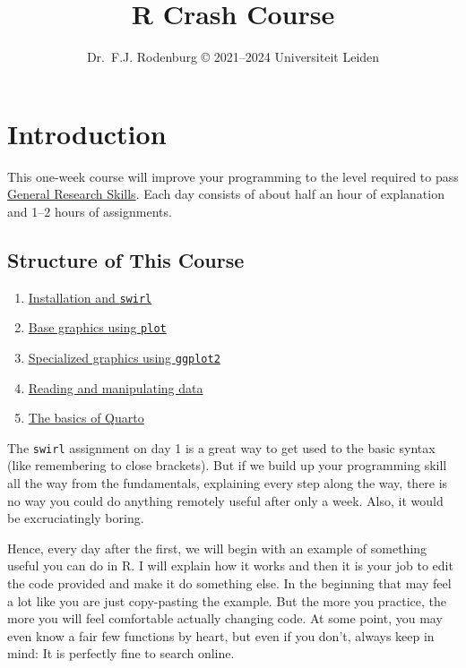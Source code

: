 \documentclass[
]{book}
\title{R Crash Course}
\author{Dr.~F.J. Rodenburg © 2021--2024 Universiteit Leiden}
\date{}
\providecommand{\tightlist}{%
  \setlength{\itemsep}{0pt}\setlength{\parskip}{0pt}}
\begin{document}
\maketitle

{
\setcounter{tocdepth}{1}
\tableofcontents
}
\hypertarget{introduction}{%
\chapter*{Introduction}\label{introduction}}

This one-week course will improve your programming to the level required to pass \href{https://ibl-inspire.github.io/General-Research-Skills/}{General Research Skills}. Each day consists of about half an hour of explanation and 1--2 hours of assignments.

\hypertarget{structure-of-this-course}{%
\section*{Structure of This Course}\label{structure-of-this-course}}

\begin{enumerate}
\def\labelenumi{\arabic{enumi}.}
\tightlist
\item
  \protect\hyperlink{installation}{Installation and \texttt{swirl}}
\item
  \protect\hyperlink{base-graphics}{Base graphics using \texttt{plot}}
\item
  \protect\hyperlink{ggplot2}{Specialized graphics using \texttt{ggplot2}}
\item
  \protect\hyperlink{data-manipulation}{Reading and manipulating data}
\item
  \protect\hyperlink{quarto}{The basics of Quarto}
\end{enumerate}

The \texttt{swirl} assignment on day 1 is a great way to get used to the basic syntax (like remembering to close brackets). But if we build up your programming skill all the way from the fundamentals, explaining every step along the way, there is no way you could do anything remotely useful after only a week. Also, it would be excruciatingly boring.

Hence, every day after the first, we will begin with an example of something useful you can do in R. I will explain how it works and then it is your job to edit the code provided and make it do something else. In the beginning that may feel a lot like you are just copy-pasting the example. But the more you practice, the more you will feel comfortable actually changing code. At some point, you may even know a fair few functions by heart, but even if you don't, always keep in mind: It is perfectly fine to search online.
\end{document}
